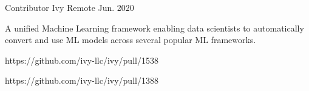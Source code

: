 \begin{cventries}
  \cventry
    {Contributor} %
    {Ivy} %
    {Remote} %
    {Jun. 2020} %
    {
      \begin{cvitems} %
        \item {A unified Machine Learning framework enabling data scientists to automatically convert and use ML models across several popular ML frameworks.}
        \item {https://github.com/ivy-llc/ivy/pull/1538}
        \item {https://github.com/ivy-llc/ivy/pull/1388}
      \end{cvitems}
    }

\end{cventries}
